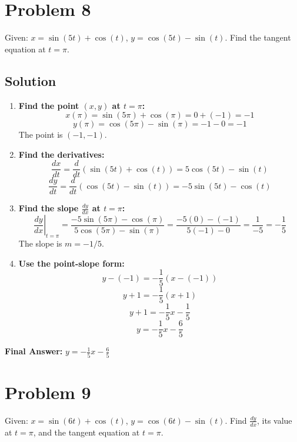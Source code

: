\documentclass{article}
\begin{document}
\section{Problem 8}
Given: $x = \sin(5t) + \cos(t)$, $y = \cos(5t) - \sin(t)$. Find the tangent equation at $t = \pi$.

\subsection*{Solution}
\begin{enumerate}
    \item \textbf{Find the point $(x,y)$ at $t=\pi$:}
    \[ x(\pi) = \sin(5\pi) + \cos(\pi) = 0 + (-1) = -1 \]
    \[ y(\pi) = \cos(5\pi) - \sin(\pi) = -1 - 0 = -1 \]
    The point is $(-1, -1)$.
    \item \textbf{Find the derivatives:}
    \[ \frac{dx}{dt} = \frac{d}{dt}(\sin(5t) + \cos(t)) = 5\cos(5t) - \sin(t) \]
    \[ \frac{dy}{dt} = \frac{d}{dt}(\cos(5t) - \sin(t)) = -5\sin(5t) - \cos(t) \]
    \item \textbf{Find the slope $\frac{dy}{dx}$ at $t=\pi$:}
    \[ \left.\frac{dy}{dx}\right|_{t=\pi} = \frac{-5\sin(5\pi) - \cos(\pi)}{5\cos(5\pi) - \sin(\pi)} = \frac{-5(0) - (-1)}{5(-1) - 0} = \frac{1}{-5} = -\frac{1}{5} \]
    The slope is $m = -1/5$.
    \item \textbf{Use the point-slope form:}
    \[ y - (-1) = -\frac{1}{5}(x - (-1)) \]
    \[ y + 1 = -\frac{1}{5}(x + 1) \]
    \[ y + 1 = -\frac{1}{5}x - \frac{1}{5} \]
    \[ y = -\frac{1}{5}x - \frac{6}{5} \]
\end{enumerate}
\textbf{Final Answer:} $y = -\frac{1}{5}x - \frac{6}{5}$

\section{Problem 9}
Given: $x = \sin(6t) + \cos(t)$, $y = \cos(6t) - \sin(t)$. Find $\frac{dy}{dx}$, its value at $t=\pi$, and the tangent equation at $t=\pi$.
\end{document}
